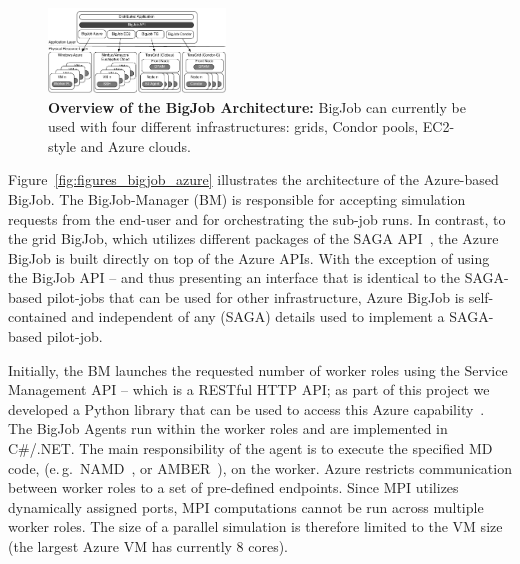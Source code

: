 \documentclass[conference,final]{IEEEtran}
\newcommand{\up}{\vspace*{-1em}}
\newcommand{\alnote}[1]{ {\textcolor{blue} { ***AL: #1 }}}
\newcommand{\jhanote}[1]{ {\textcolor{red} { ***SJ: #1 }}}
\newcommand{\alnote}[1]{}
\newcommand{\jhanote}[1]{}
\begin{document}
\begin{figure}[t]
    \centering
        \includegraphics[width=0.42\textwidth]{figures/distributed_pilot_job}
        \caption{\textbf{Overview of the BigJob Architecture:} BigJob
          can currently be used with four different infrastructures:
          grids, Condor pools, EC2-style and Azure clouds.\up}
    \label{fig:figures_distributed_pilot_job}
\end{figure}

Figure~\ref{fig:figures_bigjob_azure} illustrates the architecture of
the Azure-based BigJob. The BigJob-Manager (BM) is responsible for
accepting simulation requests from the end-user and for orchestrating
the sub-job runs.  In contrast, to the grid BigJob, which utilizes
different packages of the SAGA API~\cite{saga_url}, the Azure BigJob
is built directly on top of the Azure APIs. With the exception of
using the BigJob API -- and thus presenting an interface that is
identical to the SAGA-based pilot-jobs that can be used for other
infrastructure, Azure BigJob is self-contained and independent of any
(SAGA) details used to implement a SAGA-based pilot-job.






Initially, the BM launches the requested number of worker
roles %
using the Service Management API -- which is a RESTful HTTP API;
as part of this project we developed a Python library that can be used
to access this Azure capability~\cite{azure-service-python}. The
BigJob Agents run within the worker roles and are implemented in
C\#/.NET. The main responsibility of the agent is to execute the
specified MD code, (e.\,g.\ NAMD~\cite{Phillips:2005gd}, or
AMBER~\cite{tec2}), on the worker. Azure restricts communication
between worker roles to a set of pre-defined endpoints.
Since MPI utilizes dynamically assigned ports, MPI computations cannot
be run across multiple worker roles.  The size of a parallel
simulation is therefore limited to the VM size (the largest Azure VM
has currently 8 cores).
\end{document}
